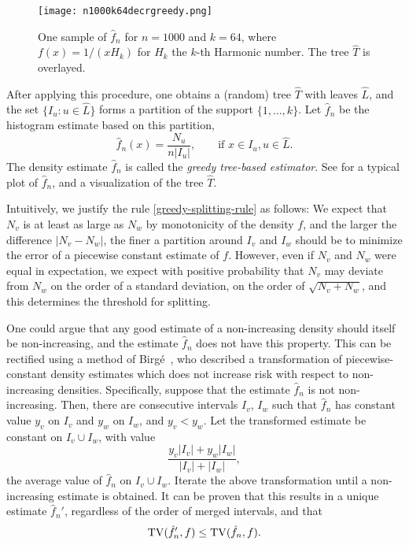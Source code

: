 \begin{figure}
  \centering
  \texttt{[image: n1000k64decrgreedy.png]}
  \caption{One sample of $\hat{f}_n$ for $n = 1000$ and $k = 64$,
    where $f(x) = 1/(x H_k)$ for $H_k$ the $k$-th Harmonic number. The
    tree $\widehat{T}$ is overlayed.}
\end{figure}
After applying this procedure, one obtains a (random) tree
$\widehat{T}$ with leaves $\widehat{L}$, and the set
$\{I_u \colon u \in \widehat{L}\}$ forms a partition of the support
$\{1, \dots, k\}$. Let $\hat{f}_n$ be the histogram estimate based on
this partition, \ie
\[
  \hat{f}_n(x) = \frac{N_u}{n |I_u|} , \qquad \text{if $x \in I_u, u \in \widehat{L}$.}
\]
The density estimate $\hat{f}_n$ is called the \emph{greedy tree-based
  estimator}. See  for a typical plot of $\hat{f}_n$,
and a visualization of the tree $\widehat{T}$.

\begin{rem}
Intuitively, we justify the rule \eqref{greedy-splitting-rule} as
follows: We expect that $N_v$ is at least as large as $N_w$ by
monotonicity of the density $f$, and the larger the difference
$|N_v - N_w|$, the finer a partition around $I_v$ and $I_w$ should be
to minimize the error of a piecewise constant estimate of
$f$. However, even if $N_v$ and $N_w$ were equal in expectation, we
expect with positive probability that $N_v$ may deviate from $N_w$ on
the order of a standard deviation, \ie on the order of
$\sqrt{N_v + N_w}$, and this determines the threshold for splitting.
\end{rem}

\begin{rem}
  One could argue that any good estimate of a non-increasing density
  should itself be non-increasing, and the estimate $\hat{f}_n$ does
  not have this property. This can be rectified using a method of
  Birg\'{e}~\cite{birge-risk}, who described a transformation of
  piecewise-constant density estimates which does not increase risk
  with respect to non-increasing densities. Specifically, suppose that
  the estimate $\hat{f}_n$ is not non-increasing. Then, there are
  consecutive intervals $I_v$, $I_w$ such that $\hat{f}_n$ has
  constant value $y_v$ on $I_v$ and $y_w$ on $I_w$, and $y_v <
  y_w$. Let the transformed estimate be constant on $I_v \cup I_w$,
  with value
  \[
    \frac{y_v |I_v| + y_w |I_w|}{|I_v| + |I_w|} ,
  \]
  \ie the average value of $\hat{f}_n$ on $I_v \cup I_w$. Iterate the
  above transformation until a non-increasing estimate is obtained. It
  can be proven that this results in a unique estimate $\hat{f}_n'$,
  regardless of the order of merged intervals, and that
  \[
    \operatorname{TV}(\hat{f}_n', f) \le \operatorname{TV}(\hat{f}_n, f) .
  \]
\end{rem}

